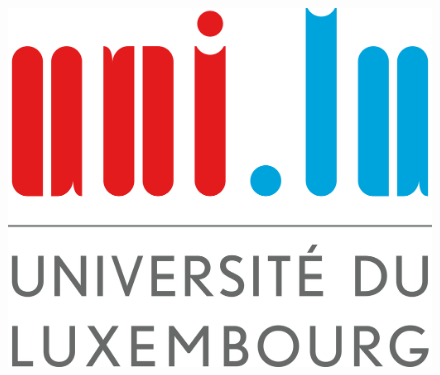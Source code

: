 \documentclass[11pt,a4paper]{report}
\begin{document}

\thispagestyle{empty}

\begin{figure}
\vspace{-1.5cm}
\includegraphics[width=0.15\columnwidth]{logo/University_of_Luxembourg_logo_(fr).png}
\centering
\end{figure}
\end{document}
